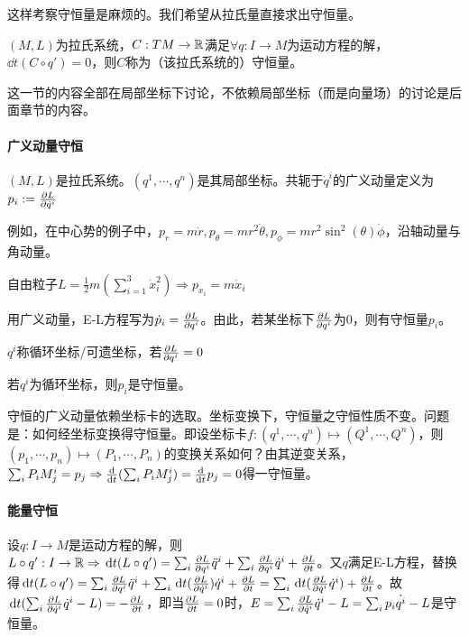 \documentclass{ctexbook}
\begin{document}
这样考察守恒量是麻烦的。我们希望从拉氏量直接求出守恒量。

\begin{Def}
  $(M,L)$为拉氏系统，$C:TM\to\mathbb{R}$满足$\forall q:I\to M$为运动方程的解，$\dd{}{t}(C\circ q')=0$，则$C$称为（该拉氏系统的）守恒量。
\end{Def}

这一节的内容全部在局部坐标下讨论，不依赖局部坐标（而是向量场）的讨论是后面章节的内容。

\paragraph{广义动量守恒}
\begin{Def}[广义动量]
  $(M,L)$是拉氏系统。$(q^{1},\cdots,q^{n})$是其局部坐标。共轭于$\dot q^{i}$的广义动量定义为$p_{i}:= \frac{\partial L}{\partial \dot q^{i}}$
\end{Def}

例如，在中心势的例子中，$p_{r}=m\dot{r}, p_{\theta}=mr^{2}\dot{\theta},p_{\phi}=mr^{2}\sin^{2}(\theta)\dot{\phi}$，沿轴动量与角动量。

\begin{Eg}
  自由粒子$L=\frac{1}{2}m(\sum\limits_{i=1}^{3}\dot{x}_{i}^{2})\Rightarrow p_{x_{i}}=m\dot{x}_{i}$
\end{Eg}

用广义动量，E-L方程写为$\dot{p}_{i}=\frac{\partial L}{\partial q^{i}}$。由此，若某坐标下$\frac{\partial L}{\partial q^{i}}$为0，则有守恒量$p_{i}$。
\begin{Def}
$q^{i}$称循环坐标/可遗坐标，若$\frac{\partial L}{\partial q^{i}}=0$
\end{Def}

\begin{Prop}
  若$q^{i}$为循环坐标，则$p_{i}$是守恒量。
\end{Prop}

守恒的广义动量依赖坐标卡的选取。坐标变换下，守恒量之守恒性质不变。问题是：如何经坐标变换得守恒量。即设坐标卡$f:(q^{1},\cdots, q^{n})\mapsto (Q^{1},\cdots,Q^{n})$，则$(p_{1},\cdots,p_{n})\mapsto (P_{1},\cdots,P_{n})$的变换关系如何？由其逆变关系，$\sum_{i}P_{i}M_{j}^{i}=p_{j}\Rightarrow \frac{\mathrm{d}}{\mathrm{d}t}(\sum_{i}P_{i}M^{i}_{j})=\frac{\mathrm{d}}{\mathrm{d}t}p_{j}=0$得一守恒量。

\paragraph{能量守恒}
设$q:I\to M$是运动方程的解，则$L\circ q':I\to \mathbb{R}\Rightarrow \,\mathrm{d}{}{t}(L\circ q')=\sum_{i}\frac{\partial L}{\partial q^{i}}\ddot q^{i}+\sum_{i}\frac{\partial L}{\partial q^{i}}\dot q^{i}+\frac{\partial L}{\partial t}$。又$q$满足E-L方程，替换得$\,\mathrm{d}{}{t}(L\circ q')=\sum_{i}\frac{\partial L}{\partial q^{i}}\ddot q^{i}+\sum_{i}\,\mathrm{d}{}{t}(\frac{\partial L}{\partial \dot q^{i}})\dot q^{i}+\frac{\partial L}{\partial t}=\sum_{i}\,\mathrm{d}{}{t}(\frac{\partial L}{\partial \dot q^{i}}\dot{q}^{i})+\frac{\partial L}{\partial t}$。故$\,\mathrm{d}{}{t}(\sum_{i}\frac{\partial L}{\partial \dot q^{i}}\dot q^{i}-L)=-\frac{\partial L}{\partial t}$，即当$\frac{\partial L}{\partial t}=0$时，$E=\sum_{i}\frac{\partial L}{\partial \dot q^{i}}\dot q^{i}-L=\sum_{i}p_{i}\dot{q^{i}}-L$是守恒量。
\end{document}

